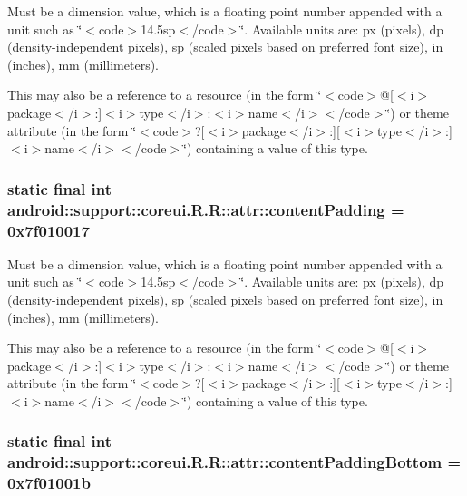 Must be a dimension value, which is a floating point number appended with a unit such as \char`\"{}$<$code$>$14.5sp$<$/code$>$\char`\"{}. Available units are: px (pixels), dp (density-independent pixels), sp (scaled pixels based on preferred font size), in (inches), mm (millimeters). 

This may also be a reference to a resource (in the form \char`\"{}$<$code$>$@\mbox{[}$<$i$>$package$<$/i$>$:\mbox{]}$<$i$>$type$<$/i$>$:$<$i$>$name$<$/i$>$$<$/code$>$\char`\"{}) or theme attribute (in the form \char`\"{}$<$code$>$?\mbox{[}$<$i$>$package$<$/i$>$:\mbox{]}\mbox{[}$<$i$>$type$<$/i$>$:\mbox{]}$<$i$>$name$<$/i$>$$<$/code$>$\char`\"{}) containing a value of this type. \hypertarget{classandroid_1_1support_1_1coreui_1_1_r_1_1attr_6cb45f25bdb6272c0f540209795a0123}{
\subsubsection[{contentPadding}]{\setlength{\rightskip}{0pt plus 5cm}static final int android::support::coreui.R.R::attr::contentPadding = 0x7f010017}}
\label{classandroid_1_1support_1_1coreui_1_1_r_1_1attr_6cb45f25bdb6272c0f540209795a0123}


Must be a dimension value, which is a floating point number appended with a unit such as \char`\"{}$<$code$>$14.5sp$<$/code$>$\char`\"{}. Available units are: px (pixels), dp (density-independent pixels), sp (scaled pixels based on preferred font size), in (inches), mm (millimeters). 

This may also be a reference to a resource (in the form \char`\"{}$<$code$>$@\mbox{[}$<$i$>$package$<$/i$>$:\mbox{]}$<$i$>$type$<$/i$>$:$<$i$>$name$<$/i$>$$<$/code$>$\char`\"{}) or theme attribute (in the form \char`\"{}$<$code$>$?\mbox{[}$<$i$>$package$<$/i$>$:\mbox{]}\mbox{[}$<$i$>$type$<$/i$>$:\mbox{]}$<$i$>$name$<$/i$>$$<$/code$>$\char`\"{}) containing a value of this type. \hypertarget{classandroid_1_1support_1_1coreui_1_1_r_1_1attr_400521c763af8dbf01b8c59ba02560e4}{
\subsubsection[{contentPaddingBottom}]{\setlength{\rightskip}{0pt plus 5cm}static final int android::support::coreui.R.R::attr::contentPaddingBottom = 0x7f01001b}}
\label{classandroid_1_1support_1_1coreui_1_1_r_1_1attr_400521c763af8dbf01b8c59ba02560e4}


